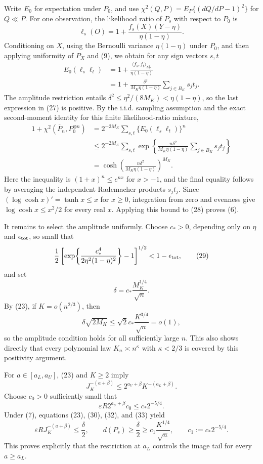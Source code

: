 Write \(E_0\) for expectation under \(P_0\), and use
\(\chi^2(Q,P)=E_P\{(dQ/dP-1)^2\}\) for \(Q\ll P\).  For one observation, the likelihood ratio of \(P_s\) with respect to \(P_0\) is
\[
\ell_s(O)
=1+\frac{f_s(X)(Y-\eta)}{\eta(1-\eta)}.
\tag{26}
\]
Conditioning on \(X\), using the Bernoulli variance \(\eta(1-\eta)\) under \(P_0\), and then applying uniformity of \(P_X\) and (9), we obtain for any sign vectors \(s,t\)
\[
\begin{aligned}
E_0(\ell_s\ell_t)
&=1+\frac{\langle f_s,f_t\rangle_{L^2_X}}{\eta(1-\eta)} \\
&=1+\frac{\delta^2}{M_K\eta(1-\eta)}
      \sum_{j\in B_K}s_jt_j.
\end{aligned}
\tag{27}
\]
The amplitude restriction entails \(\delta^2\le\eta^2/(8M_K)<\eta(1-\eta)\), so the last expression in (27) is positive.  By the i.i.d. sampling assumption and the exact second-moment identity for this finite likelihood-ratio mixture,
\[
\begin{aligned}
1+\chi^2(\overline P_n,P_0^{\otimes n})
&=2^{-2M_K}\sum_{s,t}\{E_0(\ell_s\ell_t)\}^n \\
&\le2^{-2M_K}\sum_{s,t}
\exp\!\left\{
 \frac{n\delta^2}{M_K\eta(1-\eta)}
 \sum_{j\in B_K}s_jt_j
\right\} \\
&=\cosh\!\left(
 \frac{n\delta^2}{M_K\eta(1-\eta)}
\right)^{M_K}.
\end{aligned}
\tag{28}
\]
Here the inequality is \((1+x)^n\le e^{nx}\) for \(x>-1\), and the final equality follows by averaging the independent Rademacher products \(s_jt_j\).  Since \((\log\cosh x)'=\tanh x\le x\) for \(x\ge0\), integration from zero and evenness give \(\log\cosh x\le x^2/2\) for every real \(x\).  Applying this bound to (28) proves (6).

It remains to select the amplitude uniformly.  Choose \(c_*>0\), depending only on \(\eta\) and \(\epsilon_{\rm tot}\), so small that
\[
\frac12\left[
\exp\!\left\{\frac{c_*^4}{2\eta^2(1-\eta)^2}\right\}-1
\right]^{1/2}<1-\epsilon_{\rm tot},
\tag{29}
\]
and set
\[
\delta=c_*\frac{M_K^{1/4}}{\sqrt n}.
\tag{30}
\]
By (23), if \(K=o(n^{2/3})\), then
\[
\delta\sqrt{2M_K}
\le\sqrt2c_*\frac{K^{3/4}}{\sqrt n}=o(1),
\tag{31}
\]
so the amplitude condition holds for all sufficiently large \(n\).  This also shows directly that every polynomial law \(K_n\asymp n^\kappa\) with \(\kappa<2/3\) is covered by this positivity argument.

For \(a\in[a_L,a_U]\), (23) and \(K\ge2\) imply
\[
J_K^{-(a+\beta)}
\le2^{a_U+\beta}K^{-(a_L+\beta)}.
\tag{32}
\]
Choose \(c_0>0\) sufficiently small that
\[
\varepsilon R2^{a_U+\beta}c_0
\le c_*2^{-5/4}.
\tag{33}
\]
Under (7), equations (23), (30), (32), and (33) yield
\[
\varepsilon RJ_K^{-(a+\beta)}\le\frac\delta2,
\qquad
d(P_s)\ge\frac\delta2
\ge c_1\frac{K^{1/4}}{\sqrt n},
\qquad
c_1:=c_*2^{-5/4}.
\tag{34}
\]
This proves explicitly that the restriction at \(a_L\) controls the image tail for every \(a\ge a_L\).

